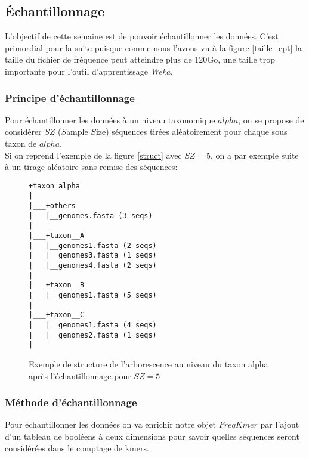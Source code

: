 \subsection{Échantillonnage}

L'objectif de cette semaine est de pouvoir échantillonner les données. C'est primordial pour la suite puisque comme nous l'avons vu 
à la figure \ref{taille_cpt} la taille du fichier de fréquence peut atteindre plus de 120Go, une taille trop importante pour l'outil d'apprentissage
\em {Weka}\em.

\subsubsection{Principe d'échantillonnage}

Pour échantillonner les données à un niveau taxonomique $alpha$, on se propose de considérer $SZ$ ($S$ample $S$ize) séquences tirées aléatoirement pour chaque sous taxon
de $alpha$.
\\

Si on reprend l'exemple de la figure \ref{struct} avec $SZ=5$, on a par exemple suite à un tirage aléatoire sans remise des séquences:

\begin{figure}[H]
\centering
\begin{varwidth}{\linewidth}
\begin{verbatim}
+taxon_alpha
|
|___+others
|   |__genomes.fasta (3 seqs)
|   
|___+taxon__A
|   |__genomes1.fasta (2 seqs)
|   |__genomes3.fasta (1 seqs) 
|   |__genomes4.fasta (2 seqs)
|   
|___+taxon__B
|   |__genomes1.fasta (5 seqs)
|   
|___+taxon__C 
|   |__genomes1.fasta (4 seqs)
|   |__genomes2.fasta (1 seqs)
|

\end{verbatim}
\end{varwidth}
\caption[Structure au niveau du taxon alpha après échantillonnage]{\label{struct_sample}Exemple de structure de l'arborescence au niveau du taxon alpha après l'échantillonnage pour $SZ=5$}
\end{figure}

\subsubsection{Méthode d'échantillonnage}

Pour échantillonner les données on va enrichir notre objet $FreqKmer$ par l'ajout d'un tableau de booléens à deux dimensions  pour savoir quelles séquences seront considérées dans le comptage de kmers.

